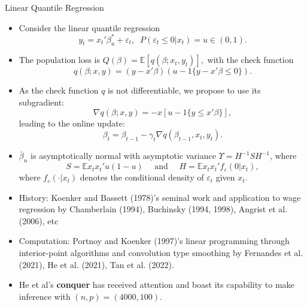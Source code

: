 \documentclass[beamer, t]{beamer}
\newcommand{\bit}{\begin{itemize}}
\newcommand{\eit}{\end{itemize}}
\begin{document}
\begin{frame}[allowframebreaks]{Linear Quantile Regression}
	
	\begin{itemize}
		\item  Consider the linear quantile regression
		$$
		y_{t}= x_t'\beta^*_u+ \varepsilon_t, \;\;  P(\varepsilon_t\leq 0|x_t)= u\in(0,1).
		$$
		
		\item The population loss is 
		$
		Q(\beta)= \mathbb E [q(\beta; x_t, y_t)], 
		$ with the check function %
		$$
		q(\beta;x, y)= (y-x'\beta)(u-1\{y-x'\beta\leq 0\}). 
		$$
		
		\item
		As the check function $q$ is not differentiable, we propose to use its subgradient:
		{\color{blue}
			$$
			\nabla q(\beta; x,y)= - x[u-1\{y\leq x'\beta\}],
			$$
		}
		leading to the online update:
		$$
		\beta_t= \beta_{t-1} - \gamma_t \nabla q(\beta_{t-1}, x_t,y_t).
		$$
		
		\item  $\bar\beta_n$ is asymptotically normal with asymptotic variance $ \Upsilon = H^{-1}SH^{-1}$, where
		$$
		S = \mathbb E x_tx_t' u(1-u) \quad
		\text{ and }\quad H= \mathbb E x_tx_t' f_{\varepsilon}(0|x_t),$$ where $f_{\varepsilon}(\cdot|x_t)$ denotes the conditional density of $\varepsilon_t$ given $x_t.$ 
		
		\item History: Koenker and Bassett (1978)'s seminal work and application to wage regression by Chamberlain (1994), Buchinsky (1994, 1998), Angrist et al. (2006), etc
		
		\item Computation: Portnoy and Koenker (1997)'s linear programming through interior-point algorithms and convolution type smoothing by Fernandes et al. (2021), He et al. (2021), Tan et al. (2022). 
		
		\item
		He et al's \textbf{conquer} has received attention and boast its capability to make inference with $ (n,p)=(4000,100) $.
		
	\end{itemize}
	
	
\end{frame} 	       


%
%
\end{document}
